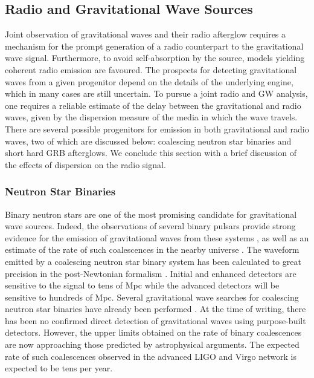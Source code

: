 \documentclass[epsf]{article}
\newcommand{\gws}{gravitational waves }
\begin{document}
\subsection{Radio and Gravitational Wave Sources} 
\label{sec:sources}

Joint observation of gravitational waves and their radio afterglow
requires a mechanism for the prompt generation of a radio counterpart to
the gravitational wave signal. Furthermore, to avoid self-absorption by
the source, models yielding coherent radio emission are favoured.  The
prospects for detecting gravitational waves from a given progenitor
depend on the details of the underlying engine, which in many cases are
still uncertain.  To pursue a joint radio and GW analysis, one requires
a reliable estimate of the delay between the gravitational and radio
waves, given by the dispersion measure of the media in which the wave
travels.  There are several possible progenitors for emission in both
gravitational and radio waves, two of which are discussed below:
coalescing neutron star binaries and short hard GRB afterglows.  We
conclude this section with a brief discussion of the effects of
dispersion on the radio signal. 

\subsubsection{Neutron Star Binaries}

Binary neutron stars are one of the most promising candidate for
gravitational wave sources.  Indeed, the observations of several binary
pulsars provide strong evidence for the emission of gravitational waves
from these systems \cite{weisberg:2004}, as well as an estimate of the
rate of such coalescences in the nearby universe \cite{Kalogera:2004tn, Kalogera:2004nt}.  The
waveform emitted by a coalescing neutron star binary system has been
calculated to great precision in the post-Newtonian formalism
\cite{Blanchet:2002av}.  Initial and enhanced detectors are sensitive
to the signal to tens of Mpc while the advanced detectors will be sensitive
to hundreds of Mpc.  Several gravitational wave searches for coalescing
neutron star binaries have already been performed \cite{Collaboration:2009tt,
Abbott:2009qj}. At the time of writing, there has been no confirmed direct
detection of \gws using purpose-built detectors.  However, the 
upper limits obtained on the rate of binary coalescences are now approaching 
those predicted by astrophysical arguments.  The expected rate of such coalescences
observed in the advanced LIGO and Virgo network is expected to be tens
per year.
\end{document}
